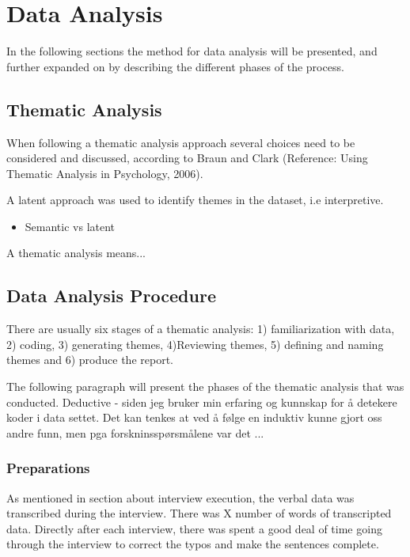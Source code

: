 \section{Data Analysis}
In the following sections the method for data analysis will be presented, and further expanded on by describing the different phases of the process.  
    \subsection{Thematic Analysis}
    When following a thematic analysis approach several choices need to be considered and discussed, according to Braun and Clark (Reference: Using Thematic Analysis in Psychology, 2006). 
    
    A latent approach was used to identify themes in the dataset, i.e interpretive.  
    
\begin{itemize}
\item     Semantic vs latent
\end{itemize}
    A thematic analysis means... 
    
    \subsection{Data Analysis Procedure}
    There are usually six stages of a thematic analysis: 1) familiarization with data, 2) coding, 3) generating themes, 4)Reviewing themes, 5) defining and naming themes and 6) produce the report.
    
    The following paragraph will present the phases of the thematic analysis that was conducted. 
    Deductive - siden jeg bruker min erfaring og kunnskap for å detekere koder i data settet. Det kan tenkes at ved å følge en induktiv kunne gjort oss andre funn, men pga forskninsspørsmålene var det ...
    
    \subsubsection{Preparations}
    As mentioned in section about interview execution, the verbal data was transcribed during the interview. There was X number of words of transcripted data. 
    Directly after each interview, there was spent a good deal of time going through the interview to correct the typos and make the sentences complete. 

